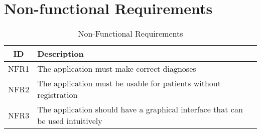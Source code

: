 \section{Non-functional Requirements}
\begin{table}[H]
	\begin{center}
		\scriptsize
		\def\arraystretch{2}%
		\begin{tabular}{ c|l }
			\hline
			\textbf{ID} & \textbf{Description}  \\
			\hline
			NFR1 & The application must make correct diagnoses  \\
			\hline
			NFR2 & The application must be usable for patients without registration  \\
			\hline
			NFR3 & The application should have a graphical interface that can be used intuitively  \\
			\hline	
		\end{tabular}
		\normalsize
	\end{center}
	\caption{Non-Functional Requirements}
\end{table}
\pagebreak



